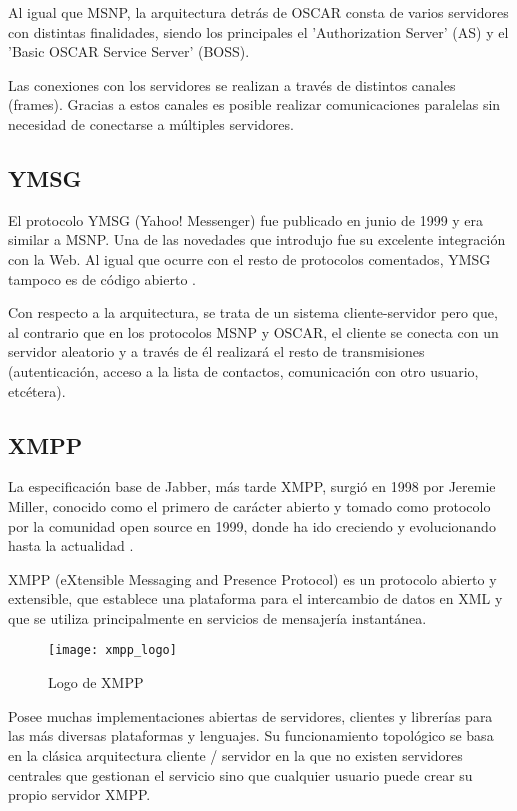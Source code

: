 Al igual que MSNP, la arquitectura detrás de OSCAR consta de varios servidores con distintas finalidades, siendo los principales el 'Authorization Server' (AS) y el 'Basic OSCAR Service Server' (BOSS).

Las conexiones con los servidores se realizan a través de distintos canales (frames). Gracias a estos canales es posible realizar comunicaciones paralelas sin necesidad de conectarse a múltiples servidores.

\subsection{YMSG}

El protocolo YMSG (Yahoo! Messenger) fue publicado en junio de 1999 y era similar a MSNP. Una de las novedades que introdujo fue su excelente integración con la Web. Al igual que ocurre con el resto de protocolos comentados, YMSG tampoco es de código abierto \cite{protocoloim1}.

Con respecto a la arquitectura, se trata de un sistema cliente-servidor pero que, al contrario que en los protocolos MSNP y OSCAR, el cliente se conecta con un servidor aleatorio y a través de él realizará el resto de transmisiones (autenticación, acceso a la lista de contactos, comunicación con otro usuario, etcétera).

\subsection{XMPP}

La especificación base de Jabber, más tarde XMPP, surgió en 1998 por Jeremie Miller, conocido como el primero de carácter abierto y tomado como protocolo por la comunidad open source en 1999, donde ha ido creciendo y evolucionando hasta la actualidad \cite{protocoloim1}.

XMPP (eXtensible Messaging and Presence Protocol) es un protocolo abierto y extensible, que establece una plataforma para el intercambio de datos en XML y que se utiliza principalmente en servicios de mensajería instantánea.

\begin{figure}[htp!]
  \centering
  \texttt{[image: xmpp\_logo]}
  \caption{Logo de XMPP}
  \label{fig:xmpp_logo}
\end{figure}

Posee muchas implementaciones abiertas de servidores, clientes y librerías para las más diversas plataformas y lenguajes. Su funcionamiento topológico se basa en la clásica arquitectura cliente / servidor en la que no existen servidores centrales que gestionan el servicio sino que cualquier usuario puede crear su propio servidor XMPP.

